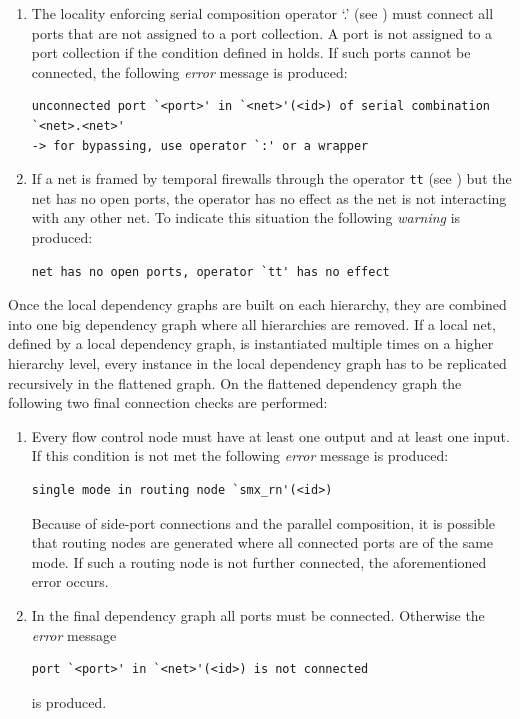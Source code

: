\begin{enumerate}
    \item The locality enforcing serial composition operator `.' (see \Def{\ref{def_smx_sl}}) must connect all ports that are not assigned to a port collection.
        A port is not assigned to a port collection if the condition defined in \Equ{\ref{eq_smx_port_no_class}} holds.
        If such ports cannot be connected, the following \emph{error} message is produced:
\begin{lstlisting}[style=msg]
unconnected port `<port>' in `<net>'(<id>) of serial combination `<net>.<net>'
-> for bypassing, use operator `:' or a wrapper
\end{lstlisting}

    \item If a net is framed by temporal firewalls through the operator \texttt{tt} (see \Sect{\ref{sect_smx_network_time}}) but the net has no open ports, the operator has no effect as the net is not interacting with any other net.
        To indicate this situation the following \emph{warning} is produced:
\begin{lstlisting}[style=msg]
net has no open ports, operator `tt' has no effect
\end{lstlisting}

\end{enumerate}

Once the local dependency graphs are built on each hierarchy, they are combined into one big dependency graph where all hierarchies are removed.
If a local net, defined by a local dependency graph, is instantiated multiple times on a higher hierarchy level, every instance in the local dependency graph has to be replicated recursively in the flattened graph.
On the flattened dependency graph the following two final connection checks are performed:
\begin{enumerate}
    \item Every flow control node must have at least one output and at least one input.
        If this condition is not met the following \emph{error} message is produced:
\begin{lstlisting}[style=msg]
single mode in routing node `smx_rn'(<id>)
\end{lstlisting}
        Because of side-port connections and the parallel composition, it is possible that routing nodes are generated where all connected ports are of the same mode.
        If such a routing node is not further connected, the aforementioned error occurs.
    \item In the final dependency graph all ports must be connected.
        Otherwise the \emph{error} message
\begin{lstlisting}[style=msg]
port `<port>' in `<net>'(<id>) is not connected
\end{lstlisting}
        is produced.
\end{enumerate}

